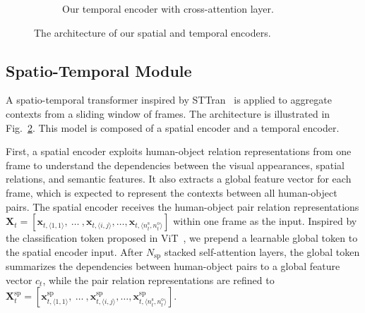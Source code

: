 \documentclass[times,twocolumn,final,authoryear]{elsarticle}
\begin{document}
\begin{figure}
\begin{subfigure}[b]{0.26\textwidth}
        \caption{Our temporal encoder with cross-attention layer. }
        \label{fig:cross_encoder}
    \end{subfigure}
    \caption{The architecture of our spatial and temporal encoders.}
    \label{fig:encoder}
\end{figure}

\subsection{Spatio-Temporal Module}
A spatio-temporal transformer inspired by STTran~\citep{hoi_v2:sttran} is applied to aggregate contexts from a sliding window of frames. The architecture is illustrated in Fig.~\ref{fig:encoder}. This model is composed of a spatial encoder and a temporal encoder.

First, a spatial encoder exploits human-object relation representations from one frame to understand the dependencies between the visual appearances, spatial relations, and semantic features. It also extracts a global feature vector for each frame, which is expected to represent the contexts between all human-object pairs. The spatial encoder receives the human-object pair relation representations $\mathbf{X}_t=[\mathbf{x}_{t,\langle 1,1 \rangle}, ~\dots~, \mathbf{x}_{t,\langle i,j \rangle}, \dots, \mathbf{x}_{t,\langle n_t^\text{s},n_t^\text{o} \rangle}]$ within one frame as the input. Inspired by the classification token proposed in ViT~\citep{transformer:vit}, we prepend a learnable global token to the spatial encoder input. After $N_\text{sp}$ stacked self-attention layers, the global token summarizes the dependencies between human-object pairs to a global feature vector $c_t$, while the pair relation representations are refined to $\mathbf{X}_t^\text{sp}=[\mathbf{x}^\text{sp}_{t,\langle 1,1 \rangle}, ~\dots~, \mathbf{x}^\text{sp}_{t,\langle i,j \rangle}, \dots, \mathbf{x}^\text{sp}_{t,\langle n_t^\text{s},n_t^\text{o} \rangle}]$.
\end{document}
